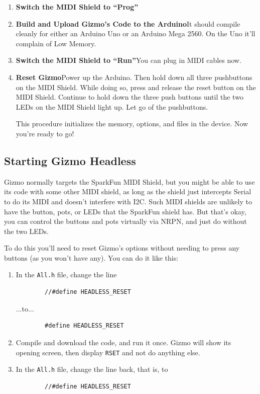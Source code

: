 \documentclass{article}
\begin{document}
\begin{enumerate}
\item {\bf Switch the MIDI Shield to ``Prog''}

\item {\bf Build and Upload Gizmo's Code to the Arduino}\quad  It should compile cleanly for either an Arduino Uno or an Arduino Mega 2560.  On the Uno it'll complain of Low Memory.

\item {\bf Switch the MIDI Shield to ``Run''}\quad  You can plug in MIDI cables now.

\item {\bf Reset Gizmo}\quad Power up the Arduino.  Then hold down all three pushbuttons on the MIDI Shield.  While doing so, press and release the reset button on the MIDI Shield.  Continue to hold down the three push buttons until the two LEDs on the MIDI Shield light up.  Let go of the pushbuttons.  

This procedure initializes the memory, options, and files in the device.  Now you're ready to go!

\end{enumerate}

\subsection{Starting Gizmo Headless}

Gizmo normally targets the SparkFun MIDI Shield, but you might be able to use its code with some other MIDI shield, as long as the shield just intercepts Serial to do its MIDI and doesn't interfere with I2C.  Such MIDI shields are unlikely to have the button, pots, or LEDs that the SparkFun shield has.  But that's okay, you can control the buttons and pots virtually via NRPN, and just do without the two LEDs.

To do this you'll need to reset Gizmo's options without needing to press any buttons (as you won't have any).  You can do it like this:

\begin{enumerate}
\item In the \texttt{All.h} file, change the line 
\begin{verbatim}
        //#define HEADLESS_RESET
\end{verbatim}
...to...
\begin{verbatim}
        #define HEADLESS_RESET
\end{verbatim}
\item Compile and download the code, and run it once.  Gizmo will show its opening screen, then display \texttt{RSET} and not do anything else.
\item In the \texttt{All.h} file, change the line back, that is, to 
\begin{verbatim}
        //#define HEADLESS_RESET
\end{verbatim}

\end{enumerate}
\end{document}
